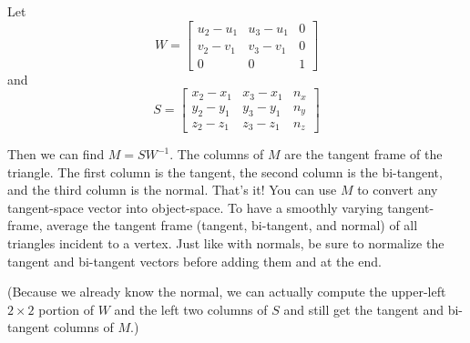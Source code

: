 \documentclass{article}
\begin{document}
Let
\[
W = \left[ \begin{array}{ccc} u_2 - u_1 & u_3 - u_1 & 0 \\ v_2 - v_1 & v_3 - v_1 & 0 \\ 0 & 0 & 1\end{array} \right]
\]
and
\[
S = \left[ \begin{array}{ccc} x_2 - x_1 & x_3 - x_1 & n_x \\ y_2 - y_1 & y_3 - y_1 & n_y \\ z_2 - z_1 & z_3 - z_1 & n_z \end{array} \right]
\]

Then we can find $M = S W^{-1}$.
The columns of $M$ are the tangent frame of the triangle. The first column is the tangent, the second column is the bi-tangent, and the third column is the normal. That's it!
You can use $M$ to convert any tangent-space vector into object-space.
To have a smoothly varying tangent-frame, average the tangent frame (tangent, bi-tangent, and normal) of all triangles incident to a vertex.
Just like with normals, be sure to normalize the tangent and bi-tangent vectors before adding them and at the end.

(Because we already know the normal, we can actually compute the upper-left $2 \times 2$ portion of $W$ and the left two columns of $S$ and still get the tangent and bi-tangent columns of $M$.)
\end{document}
